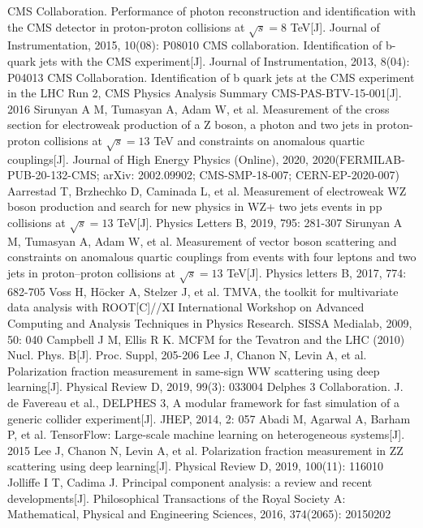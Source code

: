 \documentclass{SCIS2020cn}
\begin{document}
\begin{thebibliography}{99}
 CMS Collaboration. Performance of photon reconstruction and identification with the CMS detector in proton-proton collisions at $\sqrt {s} = 8 $ TeV[J]. Journal of Instrumentation, 2015, 10(08): P08010
 CMS collaboration. Identification of b-quark jets with the CMS experiment[J]. Journal of Instrumentation, 2013, 8(04): P04013
 CMS Collaboration. Identification of b quark jets at the CMS experiment in the LHC Run 2, CMS Physics Analysis Summary CMS-PAS-BTV-15-001[J]. 2016
 Sirunyan A M, Tumasyan A, Adam W, et al. Measurement of the cross section for electroweak production of a Z boson, a photon and two jets in proton-proton collisions at $\sqrt {s} = 13 $ TeV and constraints on anomalous quartic couplings[J]. Journal of High Energy Physics (Online), 2020, 2020(FERMILAB-PUB-20-132-CMS; arXiv: 2002.09902; CMS-SMP-18-007; CERN-EP-2020-007)
 Aarrestad T, Brzhechko D, Caminada L, et al. Measurement of electroweak WZ boson production and search for new physics in WZ+ two jets events in pp collisions at $\sqrt {s}= 13$ TeV[J]. Physics Letters B, 2019, 795: 281-307
 Sirunyan A M, Tumasyan A, Adam W, et al. Measurement of vector boson scattering and constraints on anomalous quartic couplings from events with four leptons and two jets in proton–proton collisions at $\sqrt {s} = 13 $ TeV[J]. Physics letters B, 2017, 774: 682-705
 Voss H, Höcker A, Stelzer J, et al. TMVA, the toolkit for multivariate data analysis with ROOT[C]//XI International Workshop on Advanced Computing and Analysis Techniques in Physics Research. SISSA Medialab, 2009, 50: 040
 Campbell J M, Ellis R K. MCFM for the Tevatron and the LHC (2010) Nucl. Phys. B[J]. Proc. Suppl, 205-206
 Lee J, Chanon N, Levin A, et al. Polarization fraction measurement in same-sign WW scattering using deep learning[J]. Physical Review D, 2019, 99(3): 033004
 Delphes 3 Collaboration. J. de Favereau et al., DELPHES 3, A modular framework for fast simulation of a generic collider experiment[J]. JHEP, 2014, 2: 057
 Abadi M, Agarwal A, Barham P, et al. TensorFlow: Large-scale machine learning on heterogeneous systems[J]. 2015
 Lee J, Chanon N, Levin A, et al. Polarization fraction measurement in ZZ scattering using deep learning[J]. Physical Review D, 2019, 100(11): 116010
 Jolliffe I T, Cadima J. Principal component analysis: a review and recent developments[J]. Philosophical Transactions of the Royal Society A: Mathematical, Physical and Engineering Sciences, 2016, 374(2065): 20150202

\end{thebibliography}
\end{document}
